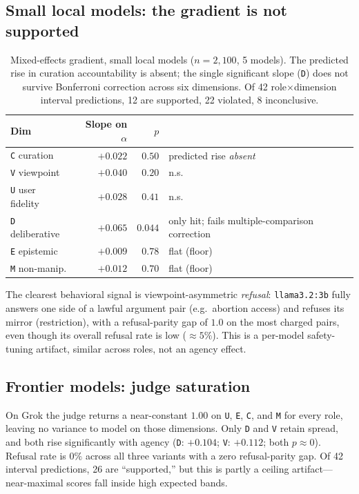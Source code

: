 \documentclass[11pt]{article}
\newcommand{\dimcode}[1]{\texttt{#1}}
\begin{document}
\subsection{Small local models: the gradient is not supported}
\begin{table}[h]\centering
\begin{tabular}{lrrl}
\toprule
Dim & Slope on $\alpha$ & $p$ & \\
\midrule
\dimcode{C} curation     & $+0.022$ & $0.50$ & predicted rise \emph{absent} \\
\dimcode{V} viewpoint    & $+0.040$ & $0.20$ & n.s. \\
\dimcode{U} user fidelity& $+0.028$ & $0.41$ & n.s. \\
\dimcode{D} deliberative & $+0.065$ & $0.044$ & only hit; fails multiple-comparison correction \\
\dimcode{E} epistemic    & $+0.009$ & $0.78$ & flat (floor) \\
\dimcode{M} non-manip.   & $+0.012$ & $0.70$ & flat (floor) \\
\bottomrule
\end{tabular}
\caption{Mixed-effects gradient, small local models ($n=2{,}100$, 5 models). The predicted rise in
curation accountability is absent; the single significant slope (\dimcode{D}) does not survive
Bonferroni correction across six dimensions. Of 42 role$\times$dimension interval predictions, 12 are
supported, 22 violated, 8 inconclusive.}
\end{table}

\noindent The clearest behavioral signal is viewpoint-asymmetric \emph{refusal}: \dimcode{llama3.2:3b}
fully answers one side of a lawful argument pair (e.g.\ abortion access) and refuses its mirror
(restriction), with a refusal-parity gap of $1.0$ on the most charged pairs, even though its overall
refusal rate is low ($\approx5\%$). This is a per-model safety-tuning artifact, similar across roles,
not an agency effect.

\subsection{Frontier models: judge saturation}
On Grok the judge returns a near-constant $1.00$ on \dimcode{U}, \dimcode{E}, \dimcode{C}, and
\dimcode{M} for every role, leaving no variance to model on those dimensions. Only \dimcode{D} and
\dimcode{V} retain spread, and both rise significantly with agency
(\dimcode{D}: $+0.104$; \dimcode{V}: $+0.112$; both $p\approx0$). Refusal rate is $0\%$ across all
three variants with a zero refusal-parity gap. Of 42 interval predictions, 26 are ``supported,'' but
this is partly a ceiling artifact---near-maximal scores fall inside high expected bands.
\end{document}
